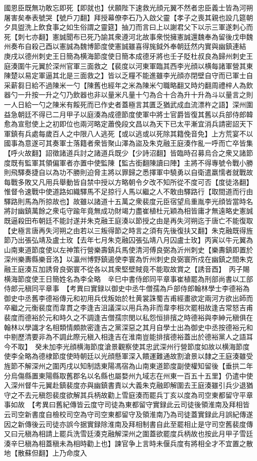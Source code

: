 國恩臣既無功敢忘即死【即就也】伏願陛下速救光顔元翼不然者忠臣義士皆為河朔屠害矣奉表號哭【號戶刀翻】拜授幕僚李石乃入啟父靈【孝子之喪其親也設几筵朝夕具盥洗上飲食事之如生俗謂之靈筵】抽刀而言曰上以謝君父下以示三軍遂刺心而死【刺七亦翻】憲誠聞布已死乃諭其衆遵河北故事衆悦擁憲誠還魏奉為留後戊申魏州奏布自殺己酉以憲誠為魏博節度使憲誠雖喜得旄鉞外奉朝廷然内實與幽鎮連結　庚戌以德州刺史王日簡為横海節度使日簡本成德牙將也壬子貶杜叔良為歸州刺史王庭湊圍牛元翼於深州官軍三面救之【裴度以河東軍臨其西李光顔以横每諸軍營其東陳楚以易定軍逼其北是三面救之】皆以乏糧不能進雖李光顔亦閉壁自守而已軍士自采薪芻日給不過陳米一勺【陳舊也經年之米為陳米勺職略翻又時灼翻周禮梓人為飲器勺一升按一升之勺乃飲器也非以量米凡量十勺為合十合為升十升為斗以量言之則一人日給一勺之陳米有餒死而已作史者蓋極言其匱乏猶武成血流漂杵之語】深州圍益急朝廷不得已二月甲子以庭湊為成德節度使軍中將士官爵皆復其舊以兵部侍郎韓愈為宣慰使上之初即位也兩河略定蕭俛段文昌以為天下已太平漸宜消兵請密詔天下軍鎮有兵處每歲百人之中限八人逃死【或以逃或以死除其籍俛音免】上方荒宴不以國事為意遂可其奏軍士落籍者衆皆聚山澤為盜及朱克融王庭湊作亂一呼而亡卒皆集【呼火故翻】詔徵諸道兵討之諸道兵既少【少詩沼翻】皆臨時召募烏合之衆又諸節度既有監軍其領偏軍者亦置中使監陳【監古銜翻陳讀曰陣】主將不得專號令戰小勝則飛驛奏捷自以為功不勝則迫脅主將以罪歸之悉擇軍中驍勇以自衛遣羸懦者就戰故每戰多敗又凡用兵舉動皆自禁中授以方略朝令夕改不知所從不度可否【度徒洛翻】惟督令速戰中使道路如織驛馬不足掠行人馬以繼之人不敢由驛路行【取間道而行由驛路則馬為所掠故也】故雖以諸道十五萬之衆裴度元臣宿望烏重胤李光顔皆當時名將討幽鎮萬餘之衆屯守踰年竟無成功財竭力盡崔植杜元穎為相皆庸才無遠略史憲誠既逼殺田布朝廷不能討遂并朱克融王庭湊以節授之由是再失河朔迄于唐亡不能復取【史極言唐再失河朔之由若以三叛得節之時言之須有先後復扶又翻】朱克融既得旌節乃出張弘靖及盧士玫【去年七月朱克融囚張弘靖八月囚盧士玫】丙寅以牛元翼為山南東道節度使以左神策行營樂壽鎮兵馬使清河傅良弼為沂州刺史【樂夀鎮即置於深州樂夀縣樂音洛】以瀛州博野鎮遏使李寰為忻州刺史良弼寰所戍在幽鎮之間朱克融王庭湊互加誘脅良弼寰不從各以其衆堅壁賊竟不能取故賞之【誘音酉】　丙子賜横海節度使王日簡姓名為李全略　辛巳中書侍郎同平章事崔植罷為刑部尚書以工部侍郎元稹同平章事　【考異曰實録以御史中丞牛僧孺為戶部侍郎翰林學士李德裕為御史中丞舊李德裕傳元和初用兵伐叛始於杜黄裳誅蜀吉甫經畫欲定兩河方欲出師而卒繼之元衡裴度而韋貫之李逢吉沮議深以用兵為非而韋李相次罷相故逢吉常怒吉甫裴度而德裕於元和時久之不調逢吉僧孺宗閔以私怨恒排擯之時德裕與李紳元稹俱在翰林以學識才名相類情頗款密逢吉之黨深惡之其月自學士出為御史中丞按德裕元和中剔歷清要非為不調此際元稹入相逢吉在淮南豈能排擯德裕蓋出於德裕黨人之語耳今不取】　癸未加李光顔横海節度滄景觀察使其忠武深州行營節度如故以横海節度使李全略為德棣節度使時朝廷以光顔懸軍深入饋運難通故割滄景以隸之王庭湊雖受旌節不解深州之圍丙戌以知制誥東陽馮宿為山南東道節度副使權知留後【垂拱二年分烏傷縣置東陽縣取舊郡名以名縣也屬婺州九域志在州東一百五十五里】仍遣中使入深州督牛元翼赴鎮裴度亦與幽鎮書責以大義朱克融即解圍去王庭湊雖引兵少退猶守之不去元稹怨裴度欲解其兵柄故勸上雪庭湊而罷兵丁亥以度為司空東都留守平章事如故　【考異曰舊紀傳皆云度守司徒為東都留守實録此云司徒後領淮南及拜相皆云司空新書度自檢校司空為守司空東都留守及領淮南乃為司徒蓋實録此月誤紀傳遂因之新傳後云司徒亦誤今据實録除淮南及拜相制書自此至罷相止是守司空舊裴度傳又曰元稹為相請上罷兵洗雪廷湊克融解深州之圍蓋欲罷度兵柄故也按此月甲子雪廷湊辛巳稹為相蓋稹未為相時勸上也】諫官争上言時未偃兵度有將相全才不宜置之散地【散蘇但翻】上乃命度入